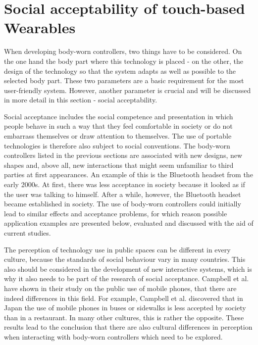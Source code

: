 \documentclass{sigchi}
\begin{document}
\section{Social acceptability of touch-based Wearables}
When developing body-worn controllers, two things have to be considered. On the one hand the body part where this technology is placed - on the other, the design of the technology so that the system adapts as well as possible to the selected body part. These two parameters are a basic requirement for the most user-friendly system. \cite{touch-wrist} However, another parameter is crucial and will be discussed in more detail in this section - social acceptability.

Social acceptance includes the social competence and presentation in which people behave in such a way that they feel comfortable in society or do not embarrass themselves or draw attention to themselves. \cite{self-everyday} The use of portable technologies is therefore also subject to social conventions. The body-worn controllers listed in the previous sections are associated with new designs, new shapes and, above all, new interactions that might seem unfamiliar to third parties at first appearances.
An example of this is the Bluetooth headset from the early 2000s. At first, there was less acceptance in society because it looked as if the user was talking to himself. After a while, however, the Bluetooth headset became established in society. \cite{usable-gesture} The use of body-worn controllers could initially lead to similar effects and acceptance problems, for which reason possible application examples are presented below, evaluated and discussed with the aid of current studies.

The perception of technology use in public spaces can be different in every culture, because the standards of social behaviour vary in many countries. This also should be considered in the development of new interactive systems, which is why it also needs to be part of the research of social acceptance. Campbell et al. have shown in their study on the public use of mobile phones, that there are indeed differences in this field. For example, Campbell et al. discovered that in Japan the use of mobile phones in buses or sidewalks is less accepted by society than in a restaurant. In many other cultures, this is rather the opposite. \cite{mobile-phones} These results lead to the conclusion that there are also cultural differences in perception when interacting with body-worn controllers which need to be explored.
\end{document}
